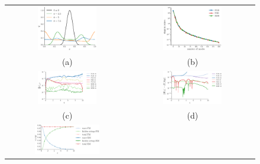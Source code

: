 \begin{figure}
\begin{tabular}{cc}
\includegraphics[width=0.5\textwidth]{./images/paper3/wave/solution} & 
\includegraphics[width=0.5\textwidth]{./images/paper3/wave/singular} \\
(a) & (b) \\
\includegraphics[width=0.5\textwidth]{./images/paper3/wave/error} & 
\includegraphics[width=0.5\textwidth]{./images/paper3/wave/energy} \\
(c) & (d) \\
\includegraphics[width=0.55\textwidth]{./images/paper3/wave/energy_conserved} &

\end{tabular}
\end{figure}
